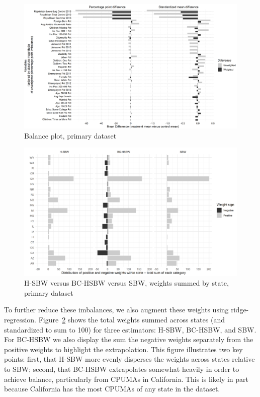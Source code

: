 \documentclass[aoas]{imsart}
\theoremstyle{plain}
\theoremstyle{remark}
\begin{document}
\begin{figure}[H]
\begin{center}
    \caption{Balance plot, primary dataset}\label{fig:loveplotc1a}
    \includegraphics[scale=0.45]{01_Plots/balance-plot-all-etuc1.png}
\end{center}
\end{figure}

\begin{figure}[H]
\begin{center}
    \caption{H-SBW versus BC-HSBW versus SBW, weights summed by state, primary dataset}
    \label{fig:sbwvhsbw1}
    \includegraphics[scale=0.55]{01_Plots/weights-by-state-sbw-hsbw-c1.png}
\end{center}
\end{figure}

To further reduce these imbalances, we also augment these weights using ridge-regression. Figure~\ref{fig:sbwvhsbw1} shows the total weights summed across states (and standardized to sum to 100) for three estimators: H-SBW, BC-HSBW, and SBW. For BC-HSBW we also display the sum the negative weights separately from the positive weights to highlight the extrapolation. This figure illustrates two key points: first, that H-SBW more evenly disperses the weights across states relative to SBW; second, that BC-HSBW extrapolates somewhat heavily in order to achieve balance, particularly from CPUMAs in California. This is likely in part because California has the most CPUMAs of any state in the dataset.
\end{document}
